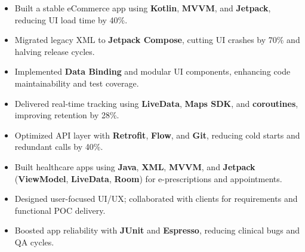 \documentclass[10pt,a4paper,ragged2e,withhyper]{altacv}
\begin{document}
\begin{paracol}{2}


\begin{itemize}
    \item Built a stable eCommerce app using \textbf{Kotlin}, \textbf{MVVM}, and \textbf{Jetpack}, reducing UI load time by 40\%.
    \item Migrated legacy XML to \textbf{Jetpack Compose}, cutting UI crashes by 70\% and halving release cycles.
    \item Implemented \textbf{Data Binding} and modular UI components, enhancing code maintainability and test coverage.
    \item Delivered real-time tracking using \textbf{LiveData}, \textbf{Maps SDK}, and \textbf{coroutines}, improving retention by 28\%.
    \item Optimized API layer with \textbf{Retrofit}, \textbf{Flow}, and \textbf{Git}, reducing cold starts and redundant calls by 40\%.
\end{itemize}

\divider


\begin{itemize}
  \item Built healthcare apps using \textbf{Java}, \textbf{XML}, \textbf{MVVM}, and \textbf{Jetpack} (\textbf{ViewModel}, \textbf{LiveData}, \textbf{Room}) for e-prescriptions and appointments.
  \item Designed user-focused UI/UX; collaborated with clients for requirements and functional POC delivery.
  \item Boosted app reliability with \textbf{JUnit} and \textbf{Espresso}, reducing clinical bugs and QA cycles.
\end{itemize}


\end{paracol}
\end{document}
